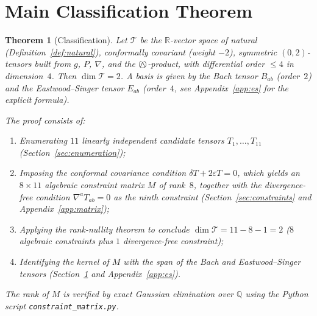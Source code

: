 \documentclass[11pt,a4paper]{article}
\newcommand{\owedge}{\mathbin{%
  \text{%
    \ooalign{%
      \hfil$\wedge$\hfil\cr
      \hfil\raisebox{0.05em}{$\bigcirc$}\hfil\cr
    }%
  }%
}}
\newtheorem{theorem}{Theorem}[section]
\begin{document}
\section{Main Classification Theorem}
\label{sec:main}

\begin{theorem}[Classification]
\label{thm:classification}
Let $\mathcal{T}$ be the $\mathbb{R}$-vector space of natural
(Definition~\ref{def:natural}), conformally covariant (weight $-2$), symmetric
$(0,2)$-tensors built from $g$, $P$, $\nabla$, and the $\owedge$-product,
with differential order $\le 4$ in dimension~$4$.
Then $\dim\mathcal{T} = 2$.
A basis is given by the Bach tensor $B_{ab}$ (order~$2$) and the
Eastwood--Singer tensor $E_{ab}$ (order~$4$, see Appendix~\ref{app:es} for the
explicit formula).

The proof consists of:
\begin{enumerate}[label=(\roman*)]
  \item Enumerating $11$ linearly independent candidate tensors
    $T_1,\ldots,T_{11}$ (Section~\ref{sec:enumeration});
  \item Imposing the conformal covariance condition
    $\delta T + 2\varepsilon T = 0$, which yields an $8 \times 11$
    algebraic constraint matrix $M$ of rank~$8$, together with the
    divergence-free condition $\nabla^a T_{ab} = 0$ as the ninth
    constraint (Section~\ref{sec:constraints} and
    Appendix~\ref{app:matrix});
  \item Applying the rank-nullity theorem to conclude
    $\dim\mathcal{T} = 11 - 8 - 1 = 2$ ($8$ algebraic constraints
    plus $1$ divergence-free constraint);
  \item Identifying the kernel of $M$ with the span of the Bach and
    Eastwood--Singer tensors (Section~\ref{sec:main} and
    Appendix~\ref{app:es}).
\end{enumerate}
The rank of $M$ is verified by exact Gaussian elimination over $\mathbb{Q}$
using the Python script \texttt{constraint\_matrix.py}.
\end{theorem}
\end{document}
